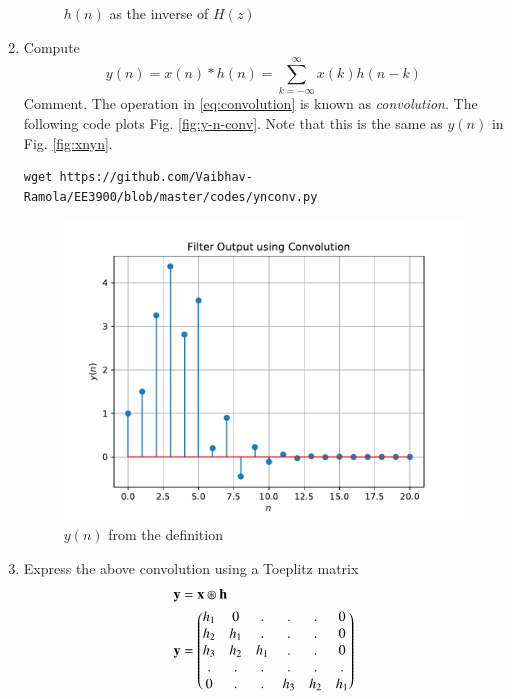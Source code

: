 \documentclass[journal,12pt,twocolumn]{IEEEtran}
\renewcommand\thesection{\arabic{section}}
\begin{document}
\begin{enumerate}[label=\thesection.\arabic*]
\begin{figure}[!ht]
		\caption{$h(n)$ as the inverse of $H(z)$}
	\label{fig:h-n-inv}
\end{figure}
\item Compute 
\begin{equation}
	\label{eq:convolution}
	y(n) = x(n)*h(n) = \sum_{k=-\infty}^{\infty}x(k)h(n-k)
\end{equation}
Comment. The operation in \eqref{eq:convolution} is known as
{\em convolution}.
\solution The following code plots Fig. \eqref{fig:y-n-conv}. Note that this is
the same as $y(n)$ in  Fig. \eqref{fig:xnyn}.
\begin{lstlisting}
wget https://github.com/Vaibhav-Ramola/EE3900/blob/master/codes/ynconv.py
\end{lstlisting}
\begin{figure}[!ht]
	\centering
	\includegraphics[width=\columnwidth]{./figs/ynconv}
	\caption{$y(n)$ from the definition}
	\label{fig:y-n-conv}
\end{figure}
\newpage
\item Express the above convolution using a Toeplitz matrix
\solution
\begin{align}
	\mathbf{y} &= \mathbf{x} \circledast \mathbf{h}\\
	\mathbf{y} &= 
	\begin{pmatrix}
		h_1 & 0 & . & . & . & 0 \\
		h_2 & h_1 & . & . & . & 0 \\
		h_3 & h_2 & h_1 & . & . & 0 \\
		. & . & . & . & . & . \\
		0 & . & . & h_3 & h_2 & h_1 \\

\end{pmatrix}
\end{align}
\end{enumerate}
\end{document}
